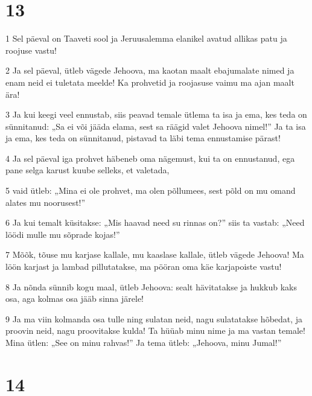 \chapter{13}

\par 1 Sel päeval on Taaveti sool ja Jeruusalemma elanikel avatud allikas patu ja roojuse vastu!
\par 2 Ja sel päeval, ütleb vägede Jehoova, ma kaotan maalt ebajumalate nimed ja enam neid ei tuletata meelde! Ka prohvetid ja roojasuse vaimu ma ajan maalt ära!
\par 3 Ja kui keegi veel ennustab, siis peavad temale ütlema ta isa ja ema, kes teda on sünnitanud: „Sa ei või jääda elama, sest sa räägid valet Jehoova nimel!” Ja ta isa ja ema, kes teda on sünnitanud, pistavad ta läbi tema ennustamise pärast!
\par 4 Ja sel päeval iga prohvet häbeneb oma nägemust, kui ta on ennustanud, ega pane selga karust kuube selleks, et valetada,
\par 5 vaid ütleb: „Mina ei ole prohvet, ma olen põllumees, sest põld on mu omand alates mu noorusest!”
\par 6 Ja kui temalt küsitakse: „Mis haavad need su rinnas on?” siis ta vastab: „Need löödi mulle mu sõprade kojas!”
\par 7 Mõõk, tõuse mu karjase kallale, mu kaaslase kallale, ütleb vägede Jehoova! Ma löön karjast ja lambad pillutatakse, ma pööran oma käe karjapoiste vastu!
\par 8 Ja nõnda sünnib kogu maal, ütleb Jehoova: sealt hävitatakse ja hukkub kaks osa, aga kolmas osa jääb sinna järele!
\par 9 Ja ma viin kolmanda osa tulle ning sulatan neid, nagu sulatatakse hõbedat, ja proovin neid, nagu proovitakse kulda! Ta hüüab minu nime ja ma vastan temale! Mina ütlen: „See on minu rahvas!” Ja tema ütleb: „Jehoova, minu Jumal!”


\chapter{14}


